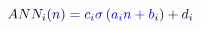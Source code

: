 \documentclass[12pt]{article}
\begin{document}
\makeatletter
\renewcommand*{\@textcolor}[3]{%
  \protect\leavevmode
  \begingroup
    \color#1{#2}#3%
  \endgroup
}
\makeatother
\begin{displaymath}
\mathcolor[RGB]{0,0,15}{A} \mathcolor[RGB]{0,0,30}{N} \mathcolor[RGB]{0,0,45}{N} _ { \mathcolor[RGB]{0,0,60}{i} } \mathcolor[RGB]{0,0,75}{(} \mathcolor[RGB]{0,0,90}{n} \mathcolor[RGB]{0,0,105}{)} \mathcolor[RGB]{0,0,120}{=} \mathcolor[RGB]{0,0,135}{c} _ { \mathcolor[RGB]{0,0,150}{i} } \mathcolor[RGB]{0,0,165}{\sigma} \mathcolor[RGB]{0,0,180}{\left(} \mathcolor[RGB]{0,0,195}{a} _ { \mathcolor[RGB]{0,0,210}{i} } \mathcolor[RGB]{0,0,225}{n} \mathcolor[RGB]{0,0,240}{+} \mathcolor[RGB]{0,0,255}{b} _ { \mathcolor[RGB]{0,15,0}{i} } \mathcolor[RGB]{0,15,15}{\right)} \mathcolor[RGB]{0,15,30}{+} \mathcolor[RGB]{0,15,45}{d} _ { \mathcolor[RGB]{0,15,60}{i} }
\end{displaymath}
\end{document}
